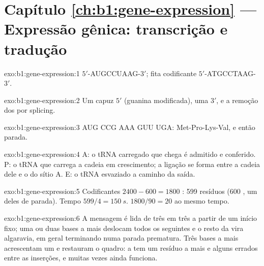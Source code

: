 \section*{Capítulo \ref{ch:b1:gene-expression} --- Expressão gênica: transcrição e tradução}

\begin{solution}{exo:b1:gene-expression:1}
 $5'$-AUGCCUAAG-$3'$; fita codificante $5'$-ATGCCTAAG-$3'$.
\end{solution}

\begin{solution}{exo:b1:gene-expression:2}
Um capuz $5'$ (guanina modificada), uma  $3'$, e a remoção
dos  por splicing.
\end{solution}

\begin{solution}{exo:b1:gene-expression:3}
AUG CCG AAA GUU UGA: Met-Pro-Lys-Val, e então parada.
\end{solution}

\begin{solution}{exo:b1:gene-expression:4}
A: o tRNA carregado que chega é admitido e conferido. P: o tRNA que
carrega a cadeia em crescimento; a ligação se forma entre a cadeia dele
e o  do sítio A. E: o tRNA esvaziado a caminho da saída.
\end{solution}

\begin{solution}{exo:b1:gene-expression:5}
Codificantes $2400 - 600 = 1800$ : 599 resíduos (600 ,
um deles de parada). Tempo $599/4 = \qty{150}{s}$. 
$1800/90 = 20$ ao mesmo tempo.
\end{solution}

\begin{solution}{exo:b1:gene-expression:6}
A mensagem é lida de três em três a partir de um início fixo; uma ou
duas bases a mais deslocam todos os  seguintes e o resto da
 vira algaravia, em geral terminando numa parada prematura. Três
bases a mais acrescentam um  e restauram o quadro: a  tem
um resíduo a mais e alguns errados entre as inserções, e muitas vezes
ainda funciona.
\end{solution}


